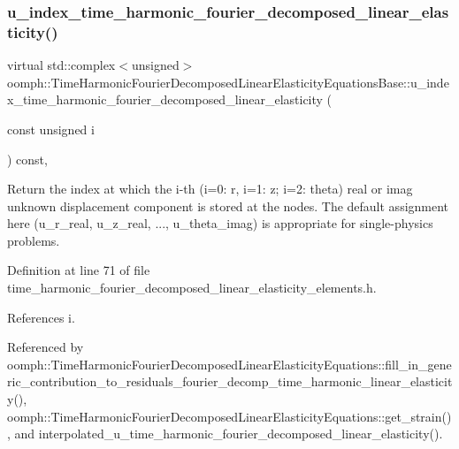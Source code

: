 \subsubsection{\texorpdfstring{u\+\_\+index\+\_\+time\+\_\+harmonic\+\_\+fourier\+\_\+decomposed\+\_\+linear\+\_\+elasticity()}{u\_index\_time\_harmonic\_fourier\_decomposed\_linear\_elasticity()}}
{\footnotesize\ttfamily virtual std\+::complex$<$unsigned$>$ oomph\+::\+Time\+Harmonic\+Fourier\+Decomposed\+Linear\+Elasticity\+Equations\+Base\+::u\+\_\+index\+\_\+time\+\_\+harmonic\+\_\+fourier\+\_\+decomposed\+\_\+linear\+\_\+elasticity (\begin{DoxyParamCaption}\item[{const unsigned}]{i }\end{DoxyParamCaption}) const\hspace{0.3cm}{\ttfamily [inline]}, {\ttfamily [virtual]}}



Return the index at which the i-\/th (i=0\+: r, i=1\+: z; i=2\+: theta) real or imag unknown displacement component is stored at the nodes. The default assignment here (u\+\_\+r\+\_\+real, u\+\_\+z\+\_\+real, ..., u\+\_\+theta\+\_\+imag) is appropriate for single-\/physics problems. 



Definition at line 71 of file time\+\_\+harmonic\+\_\+fourier\+\_\+decomposed\+\_\+linear\+\_\+elasticity\+\_\+elements.\+h.



References i.



Referenced by oomph\+::\+Time\+Harmonic\+Fourier\+Decomposed\+Linear\+Elasticity\+Equations\+::fill\+\_\+in\+\_\+generic\+\_\+contribution\+\_\+to\+\_\+residuals\+\_\+fourier\+\_\+decomp\+\_\+time\+\_\+harmonic\+\_\+linear\+\_\+elasticity(), oomph\+::\+Time\+Harmonic\+Fourier\+Decomposed\+Linear\+Elasticity\+Equations\+::get\+\_\+strain(), and interpolated\+\_\+u\+\_\+time\+\_\+harmonic\+\_\+fourier\+\_\+decomposed\+\_\+linear\+\_\+elasticity().

\mbox{\label{classoomph_1_1TimeHarmonicFourierDecomposedLinearElasticityEquationsBase_a859fdaada3e7ae1176a962fcb433ccb1}} 
